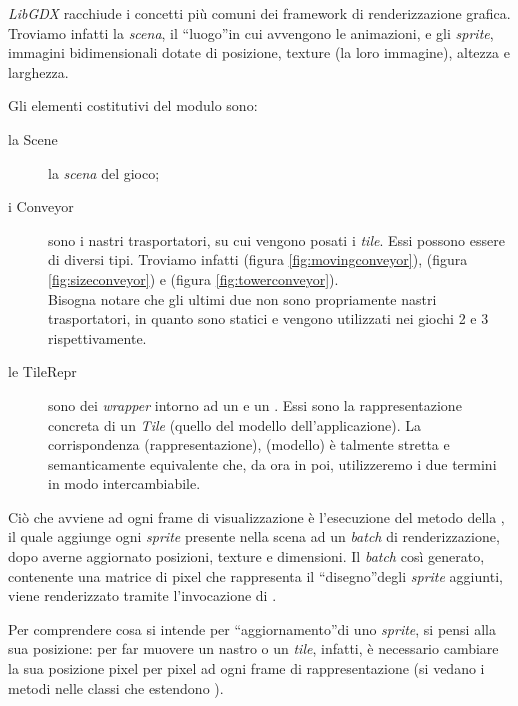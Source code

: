 \textit{LibGDX} racchiude i concetti più comuni dei framework di renderizzazione grafica. Troviamo infatti la \textit{scena}, il ``luogo''in cui avvengono le animazioni, e gli \textit{sprite}, immagini bidimensionali dotate di posizione, texture (la loro immagine), altezza e larghezza.

Gli elementi costitutivi del modulo  sono:

\begin{description}
    \item[la Scene] la \textit{scena} del gioco;
    \item[i Conveyor] sono i nastri trasportatori, su cui vengono posati i \textit{tile}. Essi possono essere di diversi tipi. Troviamo infatti  (figura \ref{fig:movingconveyor}),  (figura \ref{fig:sizeconveyor}) e  (figura \ref{fig:towerconveyor}).\\
        Bisogna notare che gli ultimi due non sono propriamente nastri trasportatori, in quanto sono statici e vengono utilizzati nei giochi 2 e 3 rispettivamente.


    \item[le TileRepr] sono dei \textit{wrapper} intorno ad un  e un . Essi sono la rappresentazione concreta di un \textit{Tile} (quello del modello dell'applicazione). La corrispondenza  (rappresentazione),  (modello) è talmente stretta e semanticamente equivalente che, da ora in poi, utilizzeremo i due termini in modo intercambiabile.
\end{description}

Ciò che avviene ad ogni frame di visualizzazione è l'esecuzione del metodo  della , il quale aggiunge ogni \textit{sprite} presente nella scena ad un \textit{batch} di renderizzazione, dopo averne aggiornato posizioni, texture e dimensioni. Il \textit{batch} così generato, contenente una matrice di pixel che rappresenta il ``disegno''degli \textit{sprite} aggiunti, viene renderizzato tramite l'invocazione di .

Per comprendere cosa si intende per ``aggiornamento''di uno \textit{sprite}, si pensi alla sua posizione: per far muovere un nastro o un \textit{tile}, infatti, è necessario cambiare la sua posizione pixel per pixel ad ogni frame di rappresentazione (si vedano i metodi  nelle classi che estendono ).

